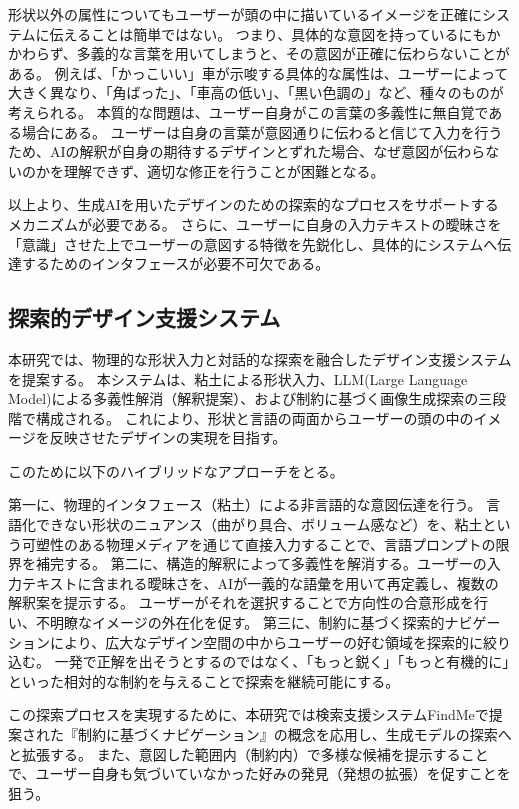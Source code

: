 \documentclass{kuisthesis}
\begin{document}
形状以外の属性についてもユーザーが頭の中に描いているイメージを正確にシステムに伝えることは簡単ではない。
つまり、具体的な意図を持っているにもかかわらず、多義的な言葉を用いてしまうと、その意図が正確に伝わらないことがある。
例えば、「かっこいい」車が示唆する具体的な属性は、ユーザーによって大きく異なり、「角ばった」、「車高の低い」、「黒い色調の」など、種々のものが考えられる。
本質的な問題は、ユーザー自身がこの言葉の多義性に無自覚である場合にある。
ユーザーは自身の言葉が意図通りに伝わると信じて入力を行うため、AIの解釈が自身の期待するデザインとずれた場合、なぜ意図が伝わらないのかを理解できず、適切な修正を行うことが困難となる。

以上より、生成AIを用いたデザインのための探索的なプロセスをサポートするメカニズムが必要である。
さらに、ユーザーに自身の入力テキストの曖昧さを「意識」させた上でユーザーの意図する特徴を先鋭化し、具体的にシステムへ伝達するためのインタフェースが必要不可欠である。

\subsection{探索的デザイン支援システム}
本研究では、物理的な形状入力と対話的な探索を融合したデザイン支援システムを提案する。
本システムは、粘土による形状入力、LLM(Large Language Model)による多義性解消（解釈提案）、および制約に基づく画像生成探索の三段階で構成される。
これにより、形状と言語の両面からユーザーの頭の中のイメージを反映させたデザインの実現を目指す。

このために以下のハイブリッドなアプローチをとる。

第一に、物理的インタフェース（粘土）による非言語的な意図伝達を行う。
言語化できない形状のニュアンス（曲がり具合、ボリューム感など）を、粘土という可塑性のある物理メディアを通じて直接入力することで、言語プロンプトの限界を補完する。
第二に、構造的解釈によって多義性を解消する。ユーザーの入力テキストに含まれる曖昧さを、AIが一義的な語彙を用いて再定義し、複数の解釈案を提示する。
ユーザーがそれを選択することで方向性の合意形成を行い、不明瞭なイメージの外在化を促す。
第三に、制約に基づく探索的ナビゲーションにより、広大なデザイン空間の中からユーザーの好む領域を探索的に絞り込む。
一発で正解を出そうとするのではなく、「もっと鋭く」「もっと有機的に」といった相対的な制約を与えることで探索を継続可能にする。

この探索プロセスを実現するために、本研究では検索支援システムFindMeで提案された『制約に基づくナビゲーション』の概念を応用し、生成モデルの探索へと拡張する。
また、意図した範囲内（制約内）で多様な候補を提示することで、ユーザー自身も気づいていなかった好みの発見（発想の拡張）を促すことを狙う。
\end{document}
